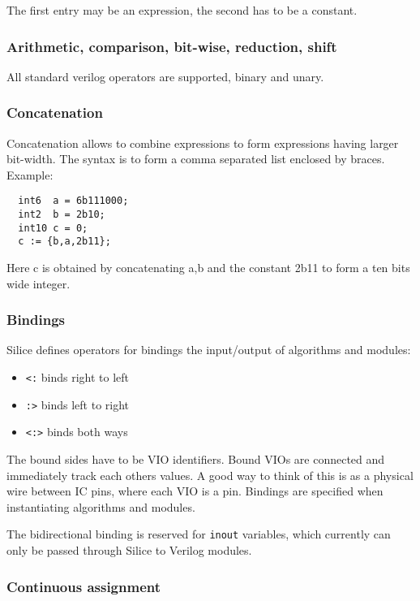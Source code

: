 \documentclass[a4]{article}
\newcommand\todo[1]{{\color{magenta}\textbf{TODO:} #1}}
\newcommand\verilog{Verilog}
\newcommand\silice{Silice}
\begin{document}
The first entry may be an expression, the second has to be a constant.

\subsubsection{Arithmetic, comparison, bit-wise, reduction, shift}

All standard verilog operators are supported, binary and unary.

\subsubsection{Concatenation}

Concatenation allows to combine expressions to form expressions having larger bit-width.
The syntax is to form a comma separated list enclosed by braces.  Example:
\begin{verbatim}
  int6  a = 6b111000;
  int2  b = 2b10;
  int10 c = 0;
  c := {b,a,2b11};
\end{verbatim}

Here c is obtained by concatenating a,b and the constant 2b11 to form a ten bits wide integer.

\subsubsection{Bindings}
\label{sec:bindings}

\silice{} defines operators for bindings the input/output of algorithms and modules:
\begin{itemize}
	\item \texttt{<:} binds right to left
	\item \texttt{:>} binds left to right
	\item \texttt{<:>} binds both ways %
\end{itemize}

The bound sides have to be VIO identifiers. 
Bound VIOs are connected and immediately track each others values.
A good way to think of this is as a physical wire between IC pins, where each VIO is a pin.
Bindings are specified when instantiating algorithms and modules. 

The bidirectional binding is reserved for \texttt{inout} variables, which currently can only be
passed through \silice{} to \verilog{} modules.

\subsubsection{Continuous assignment}
\label{sec:contassign}
\end{document}
